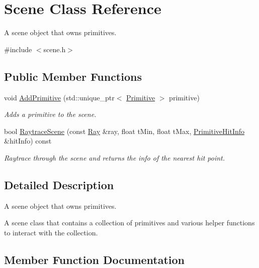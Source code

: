 \hypertarget{class_scene}{}\section{Scene Class Reference}
\label{class_scene}


A scene object that owns primitives.  




{\ttfamily \#include $<$scene.\+h$>$}

\subsection*{Public Member Functions}
\begin{DoxyCompactItemize}
\item 
void \mbox{\hyperlink{class_scene_a163adcf65b057d1dc5c47458db9794fe}{Add\+Primitive}} (std\+::unique\+\_\+ptr$<$ \mbox{\hyperlink{class_primitive}{Primitive}} $>$ primitive)
\begin{DoxyCompactList}\small\item\em Adds a primitive to the scene. \end{DoxyCompactList}\item 
bool \mbox{\hyperlink{class_scene_ac0fb34f7de9bee22ba925550322b246c}{Raytrace\+Scene}} (const \mbox{\hyperlink{class_ray}{Ray}} \&ray, float t\+Min, float t\+Max, \mbox{\hyperlink{struct_primitive_hit_info}{Primitive\+Hit\+Info}} \&hit\+Info) const
\begin{DoxyCompactList}\small\item\em Raytrace through the scene and returns the info of the nearest hit point. \end{DoxyCompactList}\end{DoxyCompactItemize}


\subsection{Detailed Description}
A scene object that owns primitives. 

A scene class that contains a collection of primitives and various helper functions to interact with the collection. 

\subsection{Member Function Documentation}
\mbox{\label{class_scene_a163adcf65b057d1dc5c47458db9794fe}} 
